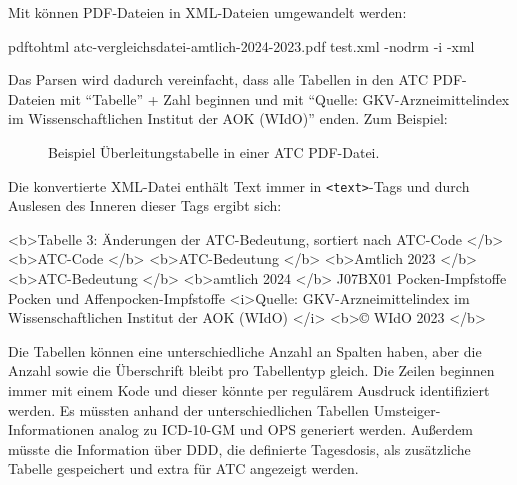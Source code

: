 Mit \cite{poppler} können PDF-Dateien in XML-Dateien umgewandelt werden:

\begin{Code}
pdftohtml atc-vergleichsdatei-amtlich-2024-2023.pdf test.xml -nodrm -i -xml
\end{Code}

Das Parsen wird dadurch vereinfacht, dass alle Tabellen in den ATC PDF-Dateien mit "`Tabelle"' + Zahl beginnen und mit "`Quelle: GKV-Arzneimittelindex im Wissenschaftlichen Institut der AOK (WIdO)"' enden. Zum Beispiel: 

\begin{figure}[H]
    \centering
    \setlength{\fboxsep}{12pt}\color{black!20}
    \normalcolor\caption{Beispiel Überleitungstabelle in einer ATC PDF-Datei.}
\end{figure}

\vspace{-1em}

Die konvertierte XML-Datei enthält Text immer in \texttt{<text>}-Tags und durch Auslesen des Inneren dieser Tags ergibt sich: 

\begin{Code}
<b>Tabelle 3: Änderungen der ATC-Bedeutung, sortiert nach ATC-Code </b>
<b>ATC-Code </b>
<b>ATC-Bedeutung  </b>
<b>Amtlich 2023 </b>
<b>ATC-Bedeutung  </b>
<b>amtlich 2024 </b>
J07BX01
Pocken-Impfstoffe
Pocken und Affenpocken-Impfstoffe
<i>Quelle: GKV-Arzneimittelindex im Wissenschaftlichen Institut der AOK (WIdO) </i>
<b>© WIdO 2023 </b>
\end{Code}

Die Tabellen können eine unterschiedliche Anzahl an Spalten haben, aber die Anzahl sowie die Überschrift bleibt pro Tabellentyp gleich. Die Zeilen beginnen immer mit einem Kode und dieser könnte per regulärem Ausdruck identifiziert werden. Es müssten anhand der unterschiedlichen Tabellen Umsteiger-Informationen analog zu ICD-10-GM und OPS generiert werden. Außerdem müsste die Information über DDD, die definierte Tagesdosis, als zusätzliche Tabelle gespeichert und extra für ATC angezeigt werden. 

